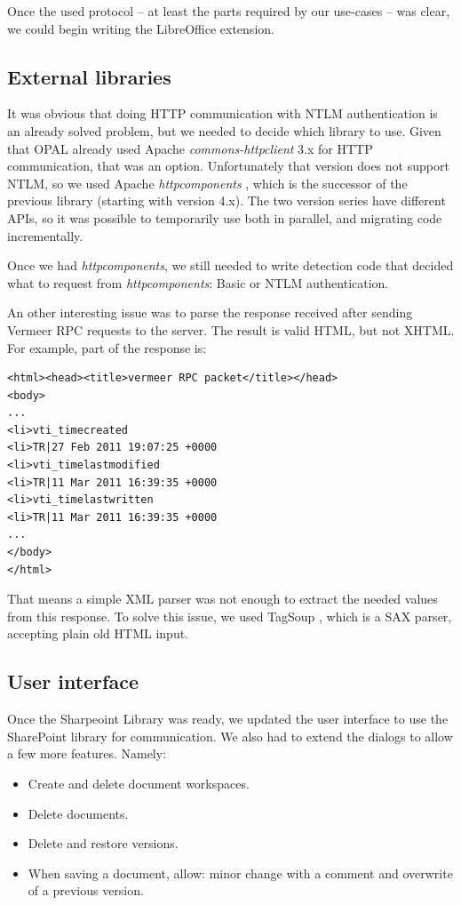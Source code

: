 Once the used protocol -- at least the parts required by our use-cases -- was
clear, we could begin writing the LibreOffice extension.

\subsection{External libraries}

It was obvious that doing HTTP communication with NTLM authentication is an
already solved problem, but we needed to decide which library to use. Given that
OPAL already used Apache \emph{commons-httpclient} \cite{httpclient} 3.x for
HTTP communication, that was an option. Unfortunately that version does not support NTLM, so we used
Apache \emph{httpcomponents} \cite{httpcomponents}, which is the successor of
the previous library (starting with version 4.x). The two version series have
different APIs, so it was possible to temporarily use both in parallel, and migrating code
incrementally.

Once we had \emph{httpcomponents}, we still needed to write detection code that
decided what to request from \emph{httpcomponents}: Basic or NTLM
authentication.

An other interesting issue was to parse the response received after sending
Vermeer RPC requests to the server. The result is valid HTML, but not XHTML.
For example, part of the response is:

\begin{lstlisting}
<html><head><title>vermeer RPC packet</title></head>
<body>
...
<li>vti_timecreated
<li>TR|27 Feb 2011 19:07:25 +0000
<li>vti_timelastmodified
<li>TR|11 Mar 2011 16:39:35 +0000
<li>vti_timelastwritten
<li>TR|11 Mar 2011 16:39:35 +0000
...
</body>
</html>\end{lstlisting}

That means a simple XML parser was not enough to extract the needed values from
this response. To solve this issue, we used TagSoup \cite{tagsoup}, which is a
SAX parser, accepting plain old HTML input.

\subsection{User interface}

Once the Sharpeoint Library was ready, we updated the user interface to use the
SharePoint library for communication. We also had to extend the dialogs to allow
a few more features. Namely:

\begin{itemize}
\item Create and delete document workspaces.
\item Delete documents.
\item Delete and restore versions.
\item When saving a document, allow: minor change with a comment and overwrite of a previous version.
\end{itemize}

